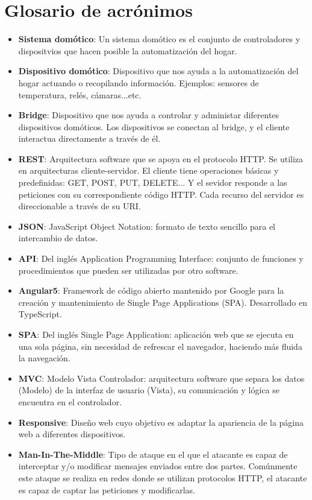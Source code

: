 \chapter*{Glosario de acrónimos}

\begin{itemize}
  
\item{\textbf{Sistema domótico}: Un sistema domótico es el conjunto de controladores y dispositvios que hacen posible la automatización del hogar.}
\item{\textbf{Dispositivo domótico}: Dispositivo que nos ayuda a la automatización del hogar actuando o recopilando información. Ejemplos: sensores de temperatura, relés, cámaras...etc. }
\item{\textbf{Bridge}: Dispositivo que nos ayuda a controlar y administar diferentes dispositivos domóticos. Los dispositivos se conectan al bridge, y el cliente interactua directamente a través de él. }
\item{\textbf{REST}: Arquitectura software que se apoya en el protocolo HTTP. Se utiliza en arquitecturas cliente-servidor. El cliente tiene operaciones básicas y predefinidas: GET, POST, PUT, DELETE... Y el sevidor responde a las peticiones con su correspondiente código HTTP.
Cada recurso del servidor es direccionable a través de su URI.}
\item{\textbf{JSON}: JavaScript Object Notation: formato de texto sencillo para el intercambio de datos.}
\item{\textbf{API}: Del inglés Application Programming Interface: conjunto de funciones y procedimientos que pueden ser utilizadas por otro software.}
\item{\textbf{Angular5}: Framework de código abierto mantenido por Google para la creación y mantenimiento de Single Page Applications (SPA). Desarrollado en TypeScript. }
\item{\textbf{SPA}: Del inglés Single Page Application: aplicación web que se ejecuta en una sola página, sin necesidad de refrescar el navegador, haciendo más fluida la navegación.}
\item{\textbf{MVC}: Modelo Vista Controlador: arquitectura software que separa los datos (Modelo) de la interfaz de usuario (Vista), su comunicación y lógica se encuentra en el controlador.}
\item{\textbf{Responsive}: Diseño web cuyo objetivo es adaptar la apariencia de la página web a diferentes dispositivos.}
\item{\textbf{Man-In-The-Middle}: Tipo de ataque en el que el atacante es capaz de interceptar y/o modificar mensajes enviados entre dos partes. 
Comúnmente este ataque se realiza en redes donde se utilizan protocolos HTTP, el atacante es capaz de captar las peticiones y modificarlas.}
\end{itemize}

\newpage \thispagestyle{empty} %

